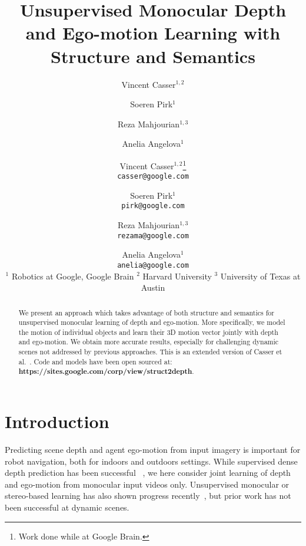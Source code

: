 \documentclass[10pt,twocolumn,letterpaper]{article}
\begin{document}
\title{Unsupervised Monocular Depth and Ego-motion Learning with \\Structure and Semantics}

\author{Vincent Casser$^{1,2}$         \and
        Soeren Pirk$^1$ \and 
        Reza Mahjourian$^{1,3}$ \and
        Anelia Angelova$^1$
}

\author{Vincent Casser$^{1,2}$\thanks{Work done while at Google Brain.} \\
{\tt\small casser@google.com}
\and
Soeren Pirk$^1$\\
{\tt\small pirk@google.com} \\
\and
Reza Mahjourian$^{1,3}$\\
{\tt\small rezama@google.com} \\
\and
Anelia Angelova$^{1}$\\
{\tt\small anelia@google.com}\\
\vspace{0.1cm}
 $^1$ Robotics at Google, Google Brain $^2$ Harvard University $^3$ University of Texas at Austin
}
\maketitle

\begin{abstract}
We present an approach which takes advantage of both structure and semantics for unsupervised monocular learning of depth and ego-motion. More specifically, we model the motion of individual objects and learn their 3D motion vector jointly with depth and ego-motion. We obtain more accurate results, especially for challenging dynamic scenes not addressed by previous approaches. This is an extended version of Casser et al.~\cite{casser2019depth}. Code and models have been open sourced at: 
\textbf{https://sites.google.com/corp/view/struct2depth}.
\end{abstract}

\section{Introduction}

\noindent Predicting scene depth  and agent ego-motion from input imagery is important for robot navigation, both for indoors and outdoors settings.  
While supervised dense depth prediction has been successful ~\cite{eigen2014depth}, we here consider joint learning of depth and ego-motion from monocular input videos only. Unsupervised monocular or stereo-based learning has also shown progress recently~\cite{zhou2017unsupervised,godard2017monodepth}, but prior work has not been successful at dynamic scenes.
\end{document}
